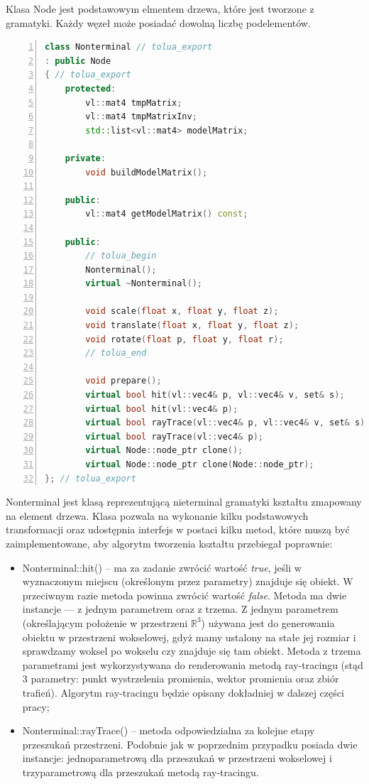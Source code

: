 Klasa Node jest podstawowym elmentem drzewa, które jest tworzone z gramatyki.
Każdy węzeł może posiadać dowolną liczbę podelementów.

{
\small
\begin{lstlisting}[language=C++,numbers=left,frame=single,numberstyle=\tiny,backgroundcolor=\color{code_back},breaklines=true]
class Nonterminal // tolua_export
: public Node
{ // tolua_export
    protected:
        vl::mat4 tmpMatrix;
        vl::mat4 tmpMatrixInv;
        std::list<vl::mat4> modelMatrix;

    private:
        void buildModelMatrix();

    public:
        vl::mat4 getModelMatrix() const;

    public:
        // tolua_begin
        Nonterminal();
        virtual ~Nonterminal();

        void scale(float x, float y, float z);
        void translate(float x, float y, float z);
        void rotate(float p, float y, float r);
        // tolua_end

        void prepare();
        virtual bool hit(vl::vec4& p, vl::vec4& v, set& s);
        virtual bool hit(vl::vec4& p);
        virtual bool rayTrace(vl::vec4& p, vl::vec4& v, set& s);
        virtual bool rayTrace(vl::vec4& p);
        virtual Node::node_ptr clone();
        virtual Node::node_ptr clone(Node::node_ptr);
}; // tolua_export
\end{lstlisting}
}

Nonterminal jest klasą reprezentującą nieterminal gramatyki kształtu zmapowany
na element drzewa. Klasa pozwala na wykonanie kilku podstawowych transformacji
oraz udostępnia interfejs w postaci kilku metod, które muszą być
zaimplementowane, aby algorytm tworzenia kształtu przebiegał poprawnie:
\begin{itemize}
  \item Nonterminal::hit() -- ma za zadanie zwrócić wartość {\em true}, jeśli
  w wyznaczonym miejscu (określonym przez parametry) znajduje się obiekt. W
  przeciwnym razie metoda powinna zwrócić wartość {\em false}. Metoda ma dwie
  instancje --- z jednym parametrem oraz z trzema. Z jednym parametrem 
  (określającym położenie w przestrzeni $\mathbb{R}^3$) używana jest do
  generowania obiektu w przestrzeni wokselowej, gdyż mamy ustalony na stałe
  jej rozmiar i sprawdzamy woksel po wokselu czy znajduje się tam obiekt. Metoda z trzema parametrami jest
  wykorzystywana do renderowania metodą ray-tracingu (stąd 3 parametry: punkt
  wystrzelenia promienia, wektor promienia oraz zbiór trafień). Algorytm
  ray-tracingu będzie opisany dokładniej w dalszej części pracy;
  \item Nonterminal::rayTrace() -- metoda odpowiedzialna za kolejne etapy
  przeszukań przestrzeni. Podobnie jak w poprzednim przypadku
  posiada dwie instancje: jednoparametrową dla przeszukań w przestrzeni wokselowej i
  trzyparametrową dla przeszukań metodą ray-tracingu.
\end{itemize}

